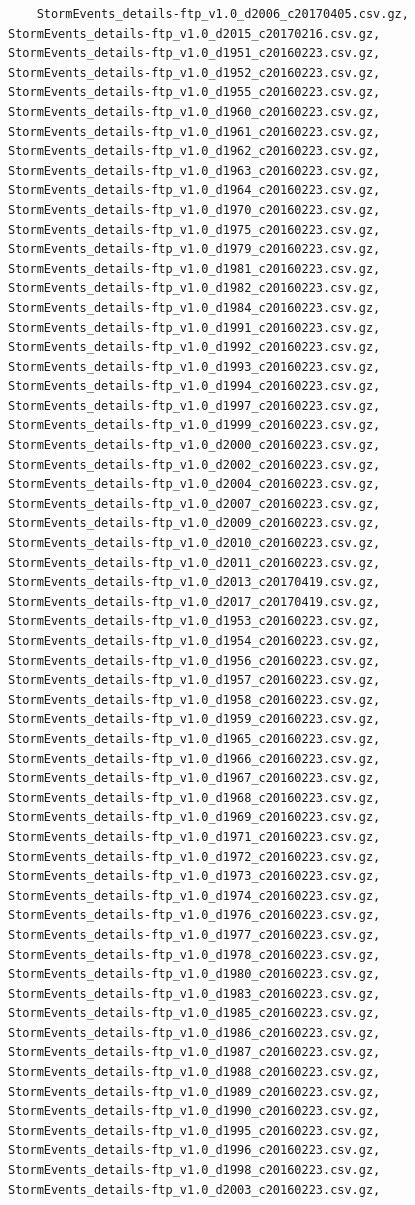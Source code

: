 \documentclass[]{article}
\begin{document}
\begin{verbatim}
    StormEvents_details-ftp_v1.0_d2006_c20170405.csv.gz, StormEvents_details-ftp_v1.0_d2015_c20170216.csv.gz, StormEvents_details-ftp_v1.0_d1951_c20160223.csv.gz, StormEvents_details-ftp_v1.0_d1952_c20160223.csv.gz, StormEvents_details-ftp_v1.0_d1955_c20160223.csv.gz, StormEvents_details-ftp_v1.0_d1960_c20160223.csv.gz, StormEvents_details-ftp_v1.0_d1961_c20160223.csv.gz, StormEvents_details-ftp_v1.0_d1962_c20160223.csv.gz, StormEvents_details-ftp_v1.0_d1963_c20160223.csv.gz, StormEvents_details-ftp_v1.0_d1964_c20160223.csv.gz, StormEvents_details-ftp_v1.0_d1970_c20160223.csv.gz, StormEvents_details-ftp_v1.0_d1975_c20160223.csv.gz, StormEvents_details-ftp_v1.0_d1979_c20160223.csv.gz, StormEvents_details-ftp_v1.0_d1981_c20160223.csv.gz, StormEvents_details-ftp_v1.0_d1982_c20160223.csv.gz, StormEvents_details-ftp_v1.0_d1984_c20160223.csv.gz, StormEvents_details-ftp_v1.0_d1991_c20160223.csv.gz, StormEvents_details-ftp_v1.0_d1992_c20160223.csv.gz, StormEvents_details-ftp_v1.0_d1993_c20160223.csv.gz, StormEvents_details-ftp_v1.0_d1994_c20160223.csv.gz, StormEvents_details-ftp_v1.0_d1997_c20160223.csv.gz, StormEvents_details-ftp_v1.0_d1999_c20160223.csv.gz, StormEvents_details-ftp_v1.0_d2000_c20160223.csv.gz, StormEvents_details-ftp_v1.0_d2002_c20160223.csv.gz, StormEvents_details-ftp_v1.0_d2004_c20160223.csv.gz, StormEvents_details-ftp_v1.0_d2007_c20160223.csv.gz, StormEvents_details-ftp_v1.0_d2009_c20160223.csv.gz, StormEvents_details-ftp_v1.0_d2010_c20160223.csv.gz, StormEvents_details-ftp_v1.0_d2011_c20160223.csv.gz, StormEvents_details-ftp_v1.0_d2013_c20170419.csv.gz, StormEvents_details-ftp_v1.0_d2017_c20170419.csv.gz, StormEvents_details-ftp_v1.0_d1953_c20160223.csv.gz, StormEvents_details-ftp_v1.0_d1954_c20160223.csv.gz, StormEvents_details-ftp_v1.0_d1956_c20160223.csv.gz, StormEvents_details-ftp_v1.0_d1957_c20160223.csv.gz, StormEvents_details-ftp_v1.0_d1958_c20160223.csv.gz, StormEvents_details-ftp_v1.0_d1959_c20160223.csv.gz, StormEvents_details-ftp_v1.0_d1965_c20160223.csv.gz, StormEvents_details-ftp_v1.0_d1966_c20160223.csv.gz, StormEvents_details-ftp_v1.0_d1967_c20160223.csv.gz, StormEvents_details-ftp_v1.0_d1968_c20160223.csv.gz, StormEvents_details-ftp_v1.0_d1969_c20160223.csv.gz, StormEvents_details-ftp_v1.0_d1971_c20160223.csv.gz, StormEvents_details-ftp_v1.0_d1972_c20160223.csv.gz, StormEvents_details-ftp_v1.0_d1973_c20160223.csv.gz, StormEvents_details-ftp_v1.0_d1974_c20160223.csv.gz, StormEvents_details-ftp_v1.0_d1976_c20160223.csv.gz, StormEvents_details-ftp_v1.0_d1977_c20160223.csv.gz, StormEvents_details-ftp_v1.0_d1978_c20160223.csv.gz, StormEvents_details-ftp_v1.0_d1980_c20160223.csv.gz, StormEvents_details-ftp_v1.0_d1983_c20160223.csv.gz, StormEvents_details-ftp_v1.0_d1985_c20160223.csv.gz, StormEvents_details-ftp_v1.0_d1986_c20160223.csv.gz, StormEvents_details-ftp_v1.0_d1987_c20160223.csv.gz, StormEvents_details-ftp_v1.0_d1988_c20160223.csv.gz, StormEvents_details-ftp_v1.0_d1989_c20160223.csv.gz, StormEvents_details-ftp_v1.0_d1990_c20160223.csv.gz, StormEvents_details-ftp_v1.0_d1995_c20160223.csv.gz, StormEvents_details-ftp_v1.0_d1996_c20160223.csv.gz, StormEvents_details-ftp_v1.0_d1998_c20160223.csv.gz, StormEvents_details-ftp_v1.0_d2003_c20160223.csv.gz, 
\end{verbatim}
\end{document}

